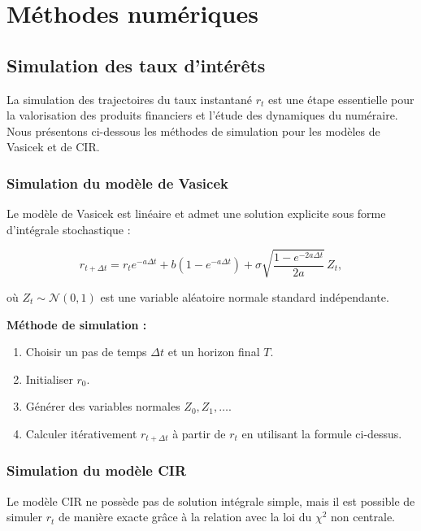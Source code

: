 \section{Méthodes numériques}

\subsection{Simulation des taux d'intérêts}
La simulation des trajectoires du taux instantané $r_t$ est une étape essentielle pour la valorisation des produits financiers et l’étude des dynamiques du numéraire. Nous présentons ci-dessous les méthodes de simulation pour les modèles de Vasicek et de CIR.

\subsubsection{Simulation du modèle de Vasicek}

Le modèle de Vasicek est linéaire et admet une solution explicite sous forme d'intégrale stochastique :

\begin{equation}
    r_{t+\Delta t} = r_t e^{-a \Delta t} + b (1 - e^{-a \Delta t}) + \sigma \sqrt{\frac{1 - e^{-2 a \Delta t}}{2a}} \, Z_t,
\end{equation}

où $Z_t \sim \mathcal{N}(0,1)$ est une variable aléatoire normale standard indépendante.

\textbf{Méthode de simulation :}
\begin{enumerate}
    \item Choisir un pas de temps $\Delta t$ et un horizon final $T$.
    \item Initialiser $r_0$.
    \item Générer des variables normales $Z_0, Z_1, \dots$.
    \item Calculer itérativement $r_{t+\Delta t}$ à partir de $r_t$ en utilisant la formule ci-dessus.
\end{enumerate}


\subsubsection{Simulation du modèle CIR}

Le modèle CIR ne possède pas de solution intégrale simple, mais il est possible de simuler $r_t$ de manière exacte grâce à la relation avec la loi du $\chi^2$ non centrale.

